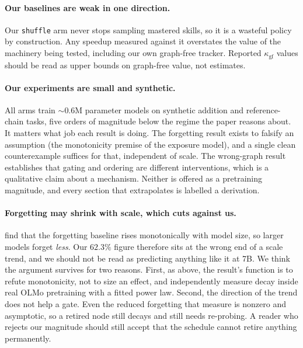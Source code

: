 \documentclass[11pt]{article}
\theoremstyle{plain}
\theoremstyle{definition}
\theoremstyle{remark}
\newcommand{\kgf}{\kappa_{\mathrm{gf}}}
\begin{document}
\paragraph{Our baselines are weak in one direction.} Our \texttt{shuffle} arm
never stops sampling mastered skills, so it is a wasteful policy by construction.
Any speedup measured against it overstates the value of the machinery being
tested, including our own graph-free tracker. Reported $\kgf$ values should be
read as upper bounds on graph-free value, not estimates.

\paragraph{Our experiments are small and synthetic.} All arms train ${\sim}0.6$M
parameter models on synthetic addition and reference-chain tasks, five orders of
magnitude below the regime the paper reasons about. It matters what job each
result is doing. The forgetting result exists to falsify an assumption (the
monotonicity premise of the exposure model), and a single clean counterexample
suffices for that, independent of scale. The wrong-graph result establishes that
gating and ordering are different interventions, which is a qualitative claim
about a mechanism. Neither is offered as a pretraining magnitude, and every
section that extrapolates is labelled a derivation.

\paragraph{Forgetting may shrink with scale, which cuts against us.}
\citet{tirumala2022memorization} find that the forgetting baseline rises
monotonically with model size, so larger models forget \emph{less}. Our $62.3\%$
figure therefore sits at the wrong end of a scale trend, and we should not be
read as predicting anything like it at 7B. We think the argument survives for two
reasons. First, as above, the result's function is to refute monotonicity, not to
size an effect, and \citet{chang2024acquire} independently measure decay inside
real OLMo pretraining with a fitted power law. Second, the direction of the trend
does not help a gate. Even the reduced forgetting that
\citet{tirumala2022memorization} measure is nonzero and asymptotic, so a retired
node still decays and still needs re-probing. A reader who rejects our magnitude
should still accept that the schedule cannot retire anything permanently.
\end{document}

